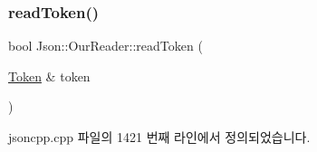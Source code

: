 \mbox{\label{class_json_1_1_our_reader_a0d1e66da47fe2e85f5033c59326dfdc3}} 
\subsubsection{\texorpdfstring{read\+Token()}{readToken()}}
{\footnotesize\ttfamily bool Json\+::\+Our\+Reader\+::read\+Token (\begin{DoxyParamCaption}\item[{\hyperlink{class_json_1_1_our_reader_1_1_token}{Token} \&}]{token }\end{DoxyParamCaption})\hspace{0.3cm}{\ttfamily [private]}}



jsoncpp.\+cpp 파일의 1421 번째 라인에서 정의되었습니다.


